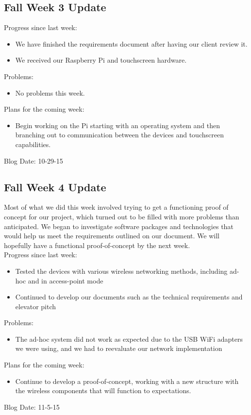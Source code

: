 \subsection{Fall Week 3 Update}
Progress since last week:
\begin{itemize}
   \item We have finished the requirements document after having our client review it.
   \item We received our Raspberry Pi and touchscreen hardware.
\end{itemize}
Problems:
\begin{itemize}
   \item No problems this week.
\end{itemize}
Plans for the coming week:
\begin{itemize}
   \item Begin working on the Pi starting with an operating system and then branching out to communication between the devices and touchscreen capabilities.
\end{itemize}
Blog Date: 10-29-15


\subsection{Fall Week 4 Update}
Most of what we did this week involved trying to get a functioning proof of concept for our project, which turned out to be filled with more problems than anticipated. We began to investigate software packages and technologies that would help us meet the requirements outlined on our document. We will hopefully have a functional proof-of-concept by the next week.\\
Progress since last week:
\begin{itemize}
   \item Tested the devices with various wireless networking methods, including ad-hoc and in access-point mode
   \item Continued to develop our documents such as the technical requirements and elevator pitch
\end{itemize}
Problems:
\begin{itemize}
   \item The ad-hoc system did not work as expected due to the USB WiFi adapters we were using, and we had to reevaluate​ our network implementation
\end{itemize}
Plans for the coming week:
\begin{itemize}
   \item Continue to develop a proof-of-concept, working with a new structure with the wireless components that will function to expectations.
\end{itemize}
Blog Date: 11-5-15

